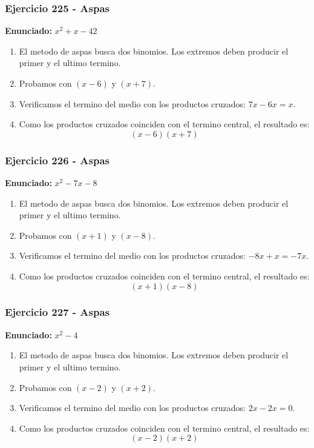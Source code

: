 \documentclass[11pt,a4paper]{article}
\begin{document}
\vspace{0.2cm}
\subsubsection*{Ejercicio 225 - Aspas}
\textbf{Enunciado:} $ x^{2} + x - 42 $\par
\begin{enumerate}[leftmargin=2em]
\item El metodo de aspas busca dos binomios. Los extremos deben producir el primer y el ultimo termino.
\item Probamos con \((x - 6)\) y \((x + 7)\).
\item Verificamos el termino del medio con los productos cruzados: \(7 x- 6 x=x\).
\item Como los productos cruzados coinciden con el termino central, el resultado es: \[\boxed{\left(x - 6\right)\left(x + 7\right)}\]
\end{enumerate}

\vspace{0.2cm}
\subsubsection*{Ejercicio 226 - Aspas}
\textbf{Enunciado:} $ x^{2} - 7 x - 8 $\par
\begin{enumerate}[leftmargin=2em]
\item El metodo de aspas busca dos binomios. Los extremos deben producir el primer y el ultimo termino.
\item Probamos con \((x + 1)\) y \((x - 8)\).
\item Verificamos el termino del medio con los productos cruzados: \(- 8 x+x=- 7 x\).
\item Como los productos cruzados coinciden con el termino central, el resultado es: \[\boxed{\left(x + 1\right)\left(x - 8\right)}\]
\end{enumerate}

\vspace{0.2cm}
\subsubsection*{Ejercicio 227 - Aspas}
\textbf{Enunciado:} $ x^{2} - 4 $\par
\begin{enumerate}[leftmargin=2em]
\item El metodo de aspas busca dos binomios. Los extremos deben producir el primer y el ultimo termino.
\item Probamos con \((x - 2)\) y \((x + 2)\).
\item Verificamos el termino del medio con los productos cruzados: \(2 x- 2 x=0\).
\item Como los productos cruzados coinciden con el termino central, el resultado es: \[\boxed{\left(x - 2\right)\left(x + 2\right)}\]
\end{enumerate}
\end{document}
